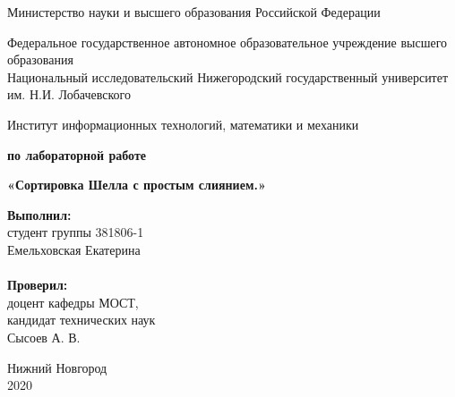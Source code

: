 \documentclass{report}
\begin{document}
\begin{titlepage}

\begin{center}
Министерство науки и высшего образования Российской Федерации
\end{center}

\begin{center}
Федеральное государственное автономное образовательное учреждение высшего образования \\
Национальный исследовательский Нижегородский государственный университет им. Н.И. Лобачевского
\end{center}

\begin{center}
Институт информационных технологий, математики и механики
\end{center}

\vspace{4em}

\begin{center}
\textbf{ по лабораторной работе} \\
\end{center}
\begin{center}
\textbf{\Large«Сортировка Шелла с простым слиянием.»} \\
\end{center}

\vspace{4em}

\newbox{\lbox}
\newlength{\maxl}
\setlength{\maxl}{\wd\lbox}
\hfill\parbox{7cm}{
\hspace*{5cm}\hspace*{-5cm}\textbf{Выполнил:} \\ студент группы 381806-1 \\ Емельховская Екатерина\\
\\
\hspace*{5cm}\hspace*{-5cm}\textbf{Проверил:}\\ доцент кафедры МОСТ, \\ кандидат технических наук \\ Сысоев А. В.\\
}
\vspace{\fill}

\begin{center} Нижний Новгород \\ 2020 \end{center}

\end{titlepage}
\end{document}
